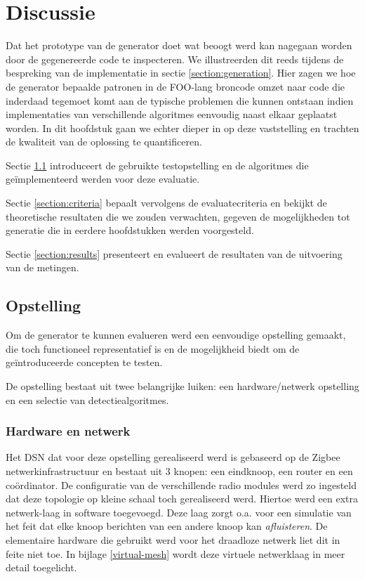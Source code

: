 
\chapter{Discussie}
\label{chapter:discussie}

Dat het prototype van de generator doet wat beoogt werd kan nagegaan worden
door de gegenereerde code te inspecteren. We illustreerden dit reeds tijdens de
bespreking van de implementatie in sectie \ref{section:generation}. Hier zagen
we hoe de generator bepaalde patronen in de FOO-lang broncode omzet naar code
die inderdaad tegemoet komt aan de typische problemen die kunnen ontstaan
indien implementaties van verschillende algoritmes eenvoudig naast elkaar
geplaatst worden. In dit hoofdstuk gaan we echter dieper in op deze
vaststelling en trachten de kwaliteit van de oplossing te quantificeren.

Sectie \ref{section:setup} introduceert de gebruikte testopstelling en de
algoritmes die ge\"implementeerd werden voor deze evaluatie.

Sectie \ref{section:criteria} bepaalt vervolgens de evaluatecriteria en bekijkt
de theoretische resultaten die we zouden verwachten, gegeven de mogelijkheden
tot generatie die in eerdere hoofdstukken werden voorgesteld.

Sectie \ref{section:results} presenteert en evalueert de resultaten van de
uitvoering van de metingen.

\section{Opstelling}
\label{section:setup}

Om de generator te kunnen evalueren werd een eenvoudige opstelling gemaakt, die
toch functioneel representatief is en de mogelijkheid biedt om de
ge\"introduceerde concepten te testen.

De opstelling bestaat uit twee belangrijke luiken: een hardware/netwerk
opstelling en een selectie van detectiealgoritmes.

\subsection{Hardware en netwerk}
\label{subsection:eval-hardware}

Het DSN dat voor deze opstelling gerealiseerd werd is gebaseerd op de Zigbee
netwerkinfrastructuur en bestaat uit 3 knopen: een eindknoop, een router en een
co\"ordinator. De configuratie van de verschillende radio modules werd zo
ingesteld dat deze topologie op kleine schaal toch gerealiseerd werd. Hiertoe
werd een extra netwerk-laag in software toegevoegd. Deze laag zorgt o.a. voor
een simulatie van het feit dat elke knoop berichten van een andere knoop kan
\emph{afluisteren}. De elementaire hardware die gebruikt werd voor het
draadloze netwerk liet dit in feite niet toe. In bijlage \ref{virtual-mesh}
wordt deze virtuele netwerklaag in meer detail toegelicht.

